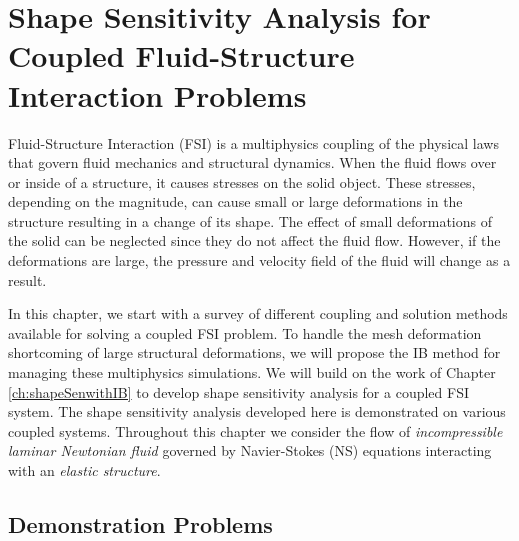 \chapter{Shape Sensitivity Analysis for Coupled Fluid-Structure Interaction Problems}\label{ch:FSIsen}
Fluid-Structure Interaction (FSI) is a multiphysics coupling of the physical laws that govern fluid mechanics and structural dynamics. When the fluid flows over or inside of a structure, it causes stresses on the solid object. These stresses, depending on the magnitude,  can cause small or large deformations in the structure resulting in a change of its shape. The effect of small deformations of the solid can be neglected since they do not affect the fluid flow. However, if the deformations are large, the pressure and velocity field of the fluid will change as a result.

In this chapter, we start with a survey of different coupling and solution methods available for solving a coupled FSI problem. To handle the mesh deformation shortcoming of large structural deformations, we will propose the IB method for managing these multiphysics simulations. We will build on the work of Chapter \ref{ch:shapeSenwithIB} to develop shape sensitivity analysis for a coupled FSI system. The shape sensitivity analysis developed here is demonstrated on various coupled systems. Throughout this chapter we consider the flow of \emph{incompressible laminar Newtonian fluid} governed by Navier-Stokes (NS) equations interacting with an \emph{elastic structure}. 



\section{Demonstration Problems}



